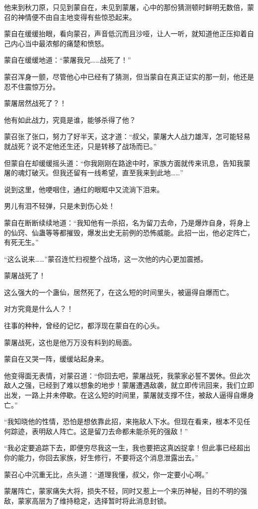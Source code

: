 \begin{this_body}
他来到秋刀原，只见到蒙自在，未见到蒙屠，心中的那份猜测顿时鲜明无数倍，蒙召的神情便不由自主地变得有些惊恐起来。

蒙自在缓缓抬眼，看向蒙召，声音低沉而且沙哑，让人一听，就知道他正压抑着自己内心当中最浓郁的痛楚和愤怒。

蒙自在缓缓地道：“蒙屠我兄……战死了！”

蒙召浑身一颤，尽管他心中已经有了猜测，但当蒙自在真正证实的那一刻，他还是忍不住震惊万分。

蒙屠居然战死了？！

他有如此战力，究竟是谁，能够杀得了他？

蒙召张了张口，努力了好半天，这才道：“叔父，蒙屠大人战力雄浑，怎可能轻易就战死？说不定他还生还，只是转移了战场而已。”

但蒙自在却缓缓摇头道：“你我刚刚在路途中时，家族方面就传来讯息，告知我蒙屠的魂灯破灭。但我还留有一线希望，直至我来到此地……”

说到这里，他哽咽住，通红的眼眶中又流淌下泪来。

男儿有泪不轻弹，只是未到伤心处！

蒙自在断断续续地道：“我知他有一杀招，名为留刀去命，乃是爆炸自身，将身上的仙窍、仙蛊等等都摧毁，爆发出史无前例的恐怖威能。此招一出，他必定阵亡，有死无生。”

“这么说来……”蒙召连忙扫视整个战场，这一次他的内心更加震撼。

蒙屠战死了！

这么强大的一个蛊仙，居然死了，在这么短的时间里头，被逼得自爆而亡。

对方究竟是什么人？！

往事的种种，曾经的记忆，都浮现在蒙自在的心头。

蒙屠战死，这也是他万万没有料到的局面。

蒙自在又哭一阵，缓缓站起身来。

他变得面无表情，对蒙召道：“你回去吧，蒙屠战死，我蒙家必誓不罢休。但此次敌人之强，已经到了难以想象的地步！蒙屠遭遇敌袭，就立即传讯回来，我们立即出发，一路上并未停歇。在这么短的时间里，蒙屠就支撑不住，被敌人逼得自爆身亡。”

“我知晓他的性情，恐怕是想依靠此招，来拖敌人下水。但现在看来，根本不见任何踪迹，表明敌人阵亡。这是留刀去命都未能杀死的强敌！”

“我必定要追踪下去，即便穷尽我这一生，我也要把这真凶捉拿！但此事已经超出你的能力，你回去家族，好生修行，不要将这个消息泄露出去。”

蒙召心中沉重无比，点头道：“道理我懂，叔父，你一定要小心啊。”

蒙屠阵亡，蒙家痛失大将，损失不轻，同时又惹上一个来历神秘，目的不明的强敌，蒙家高层为了维持稳定，选择暂时将此消息封锁。


\end{this_body}
